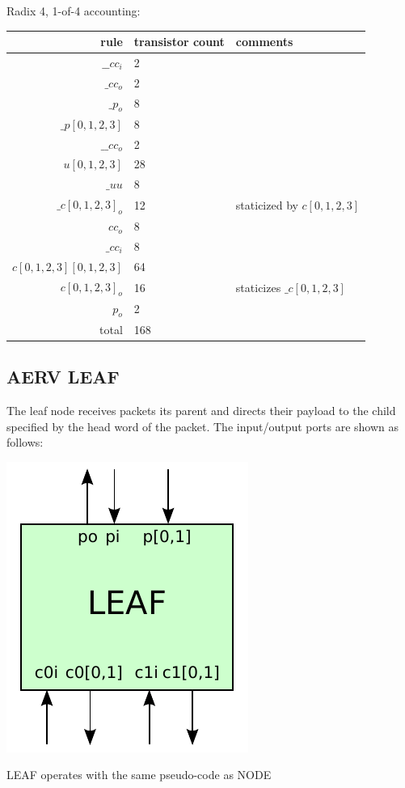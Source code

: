\documentclass{article}
\begin{document}
\noindent
Radix 4, 1-of-4 accounting: 

\begin{center}
    \begin{tabular}{|r|l|l|}
    \hline
    rule & transistor count & comments \\ \hline
    $\_\_cc_i$ & 2 & \\ \hline
    $\_cc_o$ & 2 & \\ \hline
    $\_p_o$ & 8 & \\ \hline
    $\_p[0,1,2,3]$ & 8 & \\ \hline
    $\_\_cc_o$ & 2 & \\ \hline
    $u[0,1,2,3]$ & 28 & \\ \hline
    $\_uu$ & 8 & \\ \hline
    $\_c[0,1,2,3]_o$ & 12 & staticized by $c[0,1,2,3]$ \\ \hline
    $cc_o$ & 8 & \\ \hline
    $\_cc_i$ & 8 & \\ \hline
    $c[0,1,2,3][0,1,2,3]$ & 64 & \\ \hline
    $c[0,1,2,3]_o$ & 16 & staticizes $\_c[0,1,2,3]$ \\ \hline
    $p_o$ & 2 & \\ \hline
    \hline total & 168 & \\ \hline
    \end{tabular}
\end{center}
\subsection{AERV LEAF \label{sec:AERV_LEAF}}

The leaf node receives packets its parent and directs their payload to the
child specified by the head word of the packet. 
The input/output ports are shown as follows:

\begin{center}
  \includegraphics[width=.2\textwidth]{img/aerv_leaf.pdf}
\end{center}

\noindent
LEAF operates with the same pseudo-code as NODE
\end{document}
